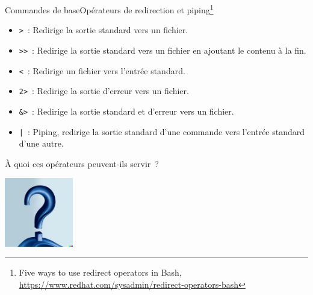 \documentclass{beamer}
\begin{document}
    \begin{frame}{Commandes de base}{Opérateurs de redirection et piping\footnote{Five ways to use redirect operators in Bash, \url{https://www.redhat.com/sysadmin/redirect-operators-bash}}}
        \begin{footnotesize}
            \begin{itemize}
                \item \lstinline{>}~: Redirige la sortie standard vers un fichier.
                \item \lstinline{>>}~: Redirige la sortie standard vers un fichier en ajoutant le contenu à la fin.
                \item \lstinline{<}~: Redirige un fichier vers l'entrée standard.
                \item \lstinline{2>}~: Redirige la sortie d'erreur vers un fichier.
                \item \lstinline{&>}~: Redirige la sortie standard et d'erreur vers un fichier.
                \item \lstinline{|}~: Piping, redirige la sortie standard d'une commande vers l'entrée standard d'une autre.
            \end{itemize}
            À quoi ces opérateurs peuvent-ils servir~?
            \begin{center}
                \includegraphics[width=3cm]{image/question-mark-on-a-blank-background.png}
            \end{center}
        \end{footnotesize}
    \end{frame}
\end{document}
